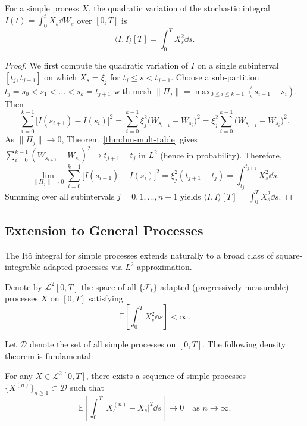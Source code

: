\begin{theorem}
\label{thm:ito-qv}
For a simple process $X$, the quadratic variation of the stochastic integral $I(t) = \int_0^t X_s \dd W_s$ over $[0, T]$ is
\[
\langle I, I \rangle[T] = \int_0^T X_s^2 \dd s.
\]
\end{theorem}
\begin{proof}
We first compute the quadratic variation of $I$ on a single subinterval $[t_j, t_{j+1}]$ on which $X_s = \xi_j$ for $t_j \le s < t_{j+1}$. Choose a sub-partition $t_j = s_0 < s_1 < \dots < s_k = t_{j+1}$ with mesh $\|\Pi_j\| = \max_{0 \le i \le k-1} (s_{i+1} - s_i)$. Then
\[
\sum_{i=0}^{k-1} \big[I(s_{i+1}) - I(s_i)\big]^2 = \sum_{i=0}^{k-1} \xi_j^2 \big(W_{s_{i+1}} - W_{s_i}\big)^2 = \xi_j^2 \sum_{i=0}^{k-1} \big(W_{s_{i+1}} - W_{s_i}\big)^2.
\]
As $\|\Pi_j\| \to 0$, Theorem~\ref{thm:bm-mult-table} gives $\sum_{i=0}^{k-1} (W_{s_{i+1}} - W_{s_i})^2 \to t_{j+1} - t_j$ in $L^2$ (hence in probability). Therefore,
\[
\lim_{\|\Pi_j\| \to 0} \sum_{i=0}^{k-1} \big[I(s_{i+1}) - I(s_i)\big]^2 = \xi_j^2 (t_{j+1} - t_j) = \int_{t_j}^{t_{j+1}} X_s^2 \dd s.
\]
Summing over all subintervals $j = 0, 1, \dots, n-1$ yields $\langle I, I \rangle[T] = \int_0^T X_s^2 \dd s$.
\end{proof}

\subsection*{Extension to General Processes}

The It\^o integral for simple processes extends naturally to a broad class of square-integrable adapted processes via $L^2$-approximation.

\begin{definition}
\label{def:L2-space}
Denote by $\mathcal{L}^2[0, T]$ the space of all $\{\mathcal{F}_t\}$-adapted (progressively measurable) processes $X$ on $[0, T]$ satisfying
\[
\mathbb{E}\left[\int_0^T X_s^2 \dd s\right] < \infty.
\]
\end{definition}

Let $\mathcal{D}$ denote the set of all simple processes on $[0, T]$. The following density theorem is fundamental:

\begin{theorem}
\label{thm:simple-density}
For any $X \in \mathcal{L}^2[0, T]$, there exists a sequence of simple processes $\{X^{(n)}\}_{n \ge 1} \subset \mathcal{D}$ such that
\[
\mathbb{E}\left[\int_0^T \big|X_s^{(n)} - X_s\big|^2 \dd s\right] \to 0 \quad \text{as } n \to \infty.
\]
\end{theorem}

